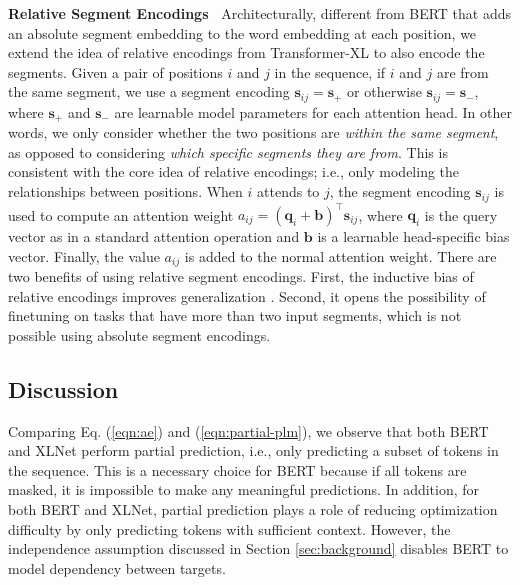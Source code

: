 \documentclass{article}
\newcommand{\mb}[1]{\boldsymbol{\mathbf{#1}}}
\begin{document}
\textbf{Relative Segment Encodings~}
Architecturally, different from BERT that adds an absolute segment embedding to the word embedding at each position, we extend the idea of relative encodings from Transformer-XL to also encode the segments. Given a pair of positions $i$ and $j$ in the sequence, if $i$ and $j$ are from the same segment, we use a segment encoding $\mathbf{s}_{ij} = \mathbf{s}_+$ or otherwise $\mb{s}_{ij} = \mb{s}_-$, where $\mathbf{s}_+$ and $\mathbf{s}_-$ are learnable model parameters for each attention head. In other words, we only consider whether the two positions are \textit{within the same segment}, as opposed to considering \textit{which specific segments they are from}. This is consistent with the core idea of relative encodings; i.e., only modeling the relationships between positions. When $i$ attends to $j$, the segment encoding $\mathbf{s}_{ij}$ is used to compute an attention weight $a_{ij} = (\mb{q}_i + \mb{b})^\top \mb{s}_{ij}$, where $\mb{q}_i$ is the query vector as in a standard attention operation and $\mb{b}$ is a learnable head-specific bias vector. Finally, the value $a_{ij}$ is added to the normal attention weight. There are two benefits of using relative segment encodings. First, the inductive bias of relative encodings improves generalization \cite{dai2019transformer}. Second, it opens the possibility of finetuning on tasks that have more than two input segments, which is not possible using absolute segment encodings.

\subsection{Discussion}

Comparing Eq. (\ref{eqn:ae}) and (\ref{eqn:partial-plm}), we observe that both BERT and XLNet perform partial prediction, i.e., only predicting a subset of tokens in the sequence. 
This is a necessary choice for BERT because if all tokens are masked, it is impossible to make any meaningful predictions. 
In addition, for both BERT and XLNet, partial prediction plays a role of reducing optimization difficulty by only predicting tokens with sufficient context. 
However, the independence assumption discussed in Section \ref{sec:background} disables BERT to model dependency between targets.
\end{document}
